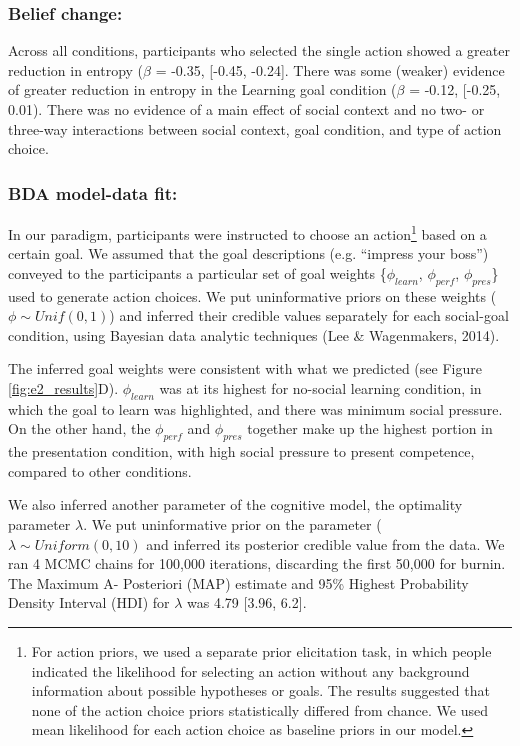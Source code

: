 \documentclass[10pt, letterpaper]{article}
\begin{document}
\subsubsection{Belief change:}\label{belief-change-1}

Across all conditions, participants who selected the single action
showed a greater reduction in entropy (\(\beta\) = -0.35, {[}-0.45,
-0.24{]}. There was some (weaker) evidence of greater reduction in
entropy in the Learning goal condition (\(\beta\) = -0.12, {[}-0.25,
0.01). There was no evidence of a main effect of social context and no
two- or three-way interactions between social context, goal condition,
and type of action choice.

\subsubsection{BDA model-data fit:}\label{bda-model-data-fit}

In our paradigm, participants were instructed to choose an
action\footnote{For action priors, we used a separate prior elicitation task, in which people indicated the likelihood for selecting an action without any background information about possible hypotheses or goals. The results suggested that none of the action choice priors statistically differed from chance. We used mean likelihood for each action choice as baseline priors in our model.}
based on a certain goal. We assumed that the goal descriptions (e.g.
``impress your boss'') conveyed to the participants a particular set of
goal weights \{\(\phi_{learn}\), \(\phi_{perf}\), \(\phi_{pres}\)\} used
to generate action choices. We put uninformative priors on these weights
(\(\phi \sim Unif(0,1)\)) and inferred their credible values separately
for each social-goal condition, using Bayesian data analytic techniques
(Lee \& Wagenmakers, 2014).

The inferred goal weights were consistent with what we predicted (see
Figure \ref{fig:e2_results}D). \(\phi_{learn}\) was at its highest for
no-social learning condition, in which the goal to learn was
highlighted, and there was minimum social pressure. On the other hand,
the \(\phi_{perf}\) and \(\phi_{pres}\) together make up the highest
portion in the presentation condition, with high social pressure to
present competence, compared to other conditions.

We also inferred another parameter of the cognitive model, the
optimality parameter \(\lambda\). We put uninformative prior on the
parameter (\(\lambda \sim Uniform(0,10)\) and inferred its posterior
credible value from the data. We ran 4 MCMC chains for 100,000
iterations, discarding the first 50,000 for burnin. The Maximum A-
Posteriori (MAP) estimate and 95\% Highest Probability Density Interval
(HDI) for \(\lambda\) was 4.79 {[}3.96, 6.2{]}.
\end{document}
